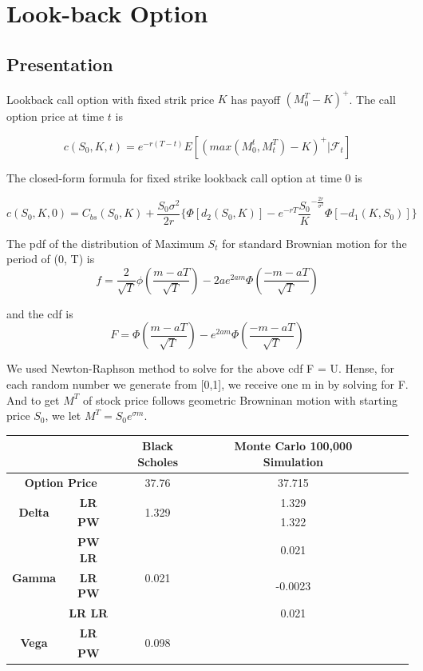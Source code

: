 \documentclass[11pt,a4paper,fleqn]{article}
\begin{document}
\section{Look-back Option}
\subsection{Presentation}
Lookback call option with fixed strik price $K$ has payoff $(M^T_{0}-K)^+$. The call option price at time $t$ is

$$c(S_0,K,t) = e^{-r(T-t)}E[(max(M^t_0,M^T_t)-K)^+|\mathcal{F}_t] $$

The closed-form formula for fixed strike lookback call option at time 0 \cite{lectures, exooptions} is

$$c(S_0,K,0)=C_{bs}(S_0,K) + \frac{S_0\sigma^2}{2r}\{ \Phi[d_2(S_0,K)]-e^{-rT}\frac{S_0}{K}^{-\frac{2r}{\sigma^2}} \Phi[-d_1(K,S_0)]\}$$


The pdf of the distribution of Maximum $S_t$ for standard Brownian motion for the period of (0, T) is
$$f = \frac{2}{\sqrt{T}}\phi\left(\frac{m-aT}{\sqrt{T}}\right)-2ae^{2am}\Phi\left(\frac{-m-aT}{\sqrt{T}}\right)$$

and the cdf is
$$F = \Phi\left(\frac{m-aT}{\sqrt{T}}\right)-e^{2am}\Phi\left(\frac{-m-aT}{\sqrt{T}}\right)$$

We used Newton-Raphson method to solve for the above cdf F = U. Hense, for each random number we generate from [0,1], we receive one m in by solving for F. And to get $M^T$ of stock price follows geometric Browninan motion with starting price $S_0$, we let $M^T=S_0e^{\sigma m }$.\\

\begin{tabular}{|c|c|c|c|c|c|}
\hline
\multicolumn{2}{|l|}{}             & \textbf{Black Scholes} & \textbf{Monte Carlo 100,000 Simulation} \\ \hline
\multicolumn{2}{|c|}{\textbf{Option Price}}      & 37.76 &  37.715       \\ \hline
\multirow{2}{*}{\textbf{Delta}} & \textbf{LR}    & \multirow{2}{*}{1.329}                &1.329      \\
                                & \textbf{PW}    &                                          & 1.322              \\ \hline
\multirow{3}{*}{\textbf{Gamma}} & \textbf{PW LR} & \multirow{3}{*}{0.021}                 & 0.021       \\
                                & \textbf{LR PW} &                                           & -0.0023      \\
                                & \textbf{LR LR} &                                          & 0.021        \\ \hline
\multirow{2}{*}{\textbf{Vega}}  & \textbf{LR}    & \multirow{2}{*}{0.098} &          \\
                                & \textbf{PW}    &                                             &          \\ \hline
\end{tabular}\\
\end{document}
